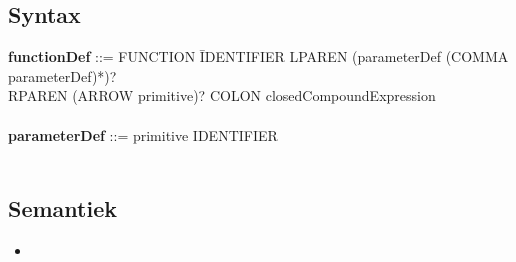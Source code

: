     \subsection{Syntax}
        \begin{tabbing}
            {\bf functionDef}                 ::= FUNCTION \=IDENTIFIER LPAREN (parameterDef (COMMA parameterDef)*)?\\
                                                  \>RPAREN (ARROW primitive)? COLON closedCompoundExpression\\
            \\
            {\bf parameterDef}                ::= primitive IDENTIFIER \\
            \\
        \end{tabbing}
    \subsection{Semantiek}
        \begin{itemize}
        \item 
        \end{itemize}

